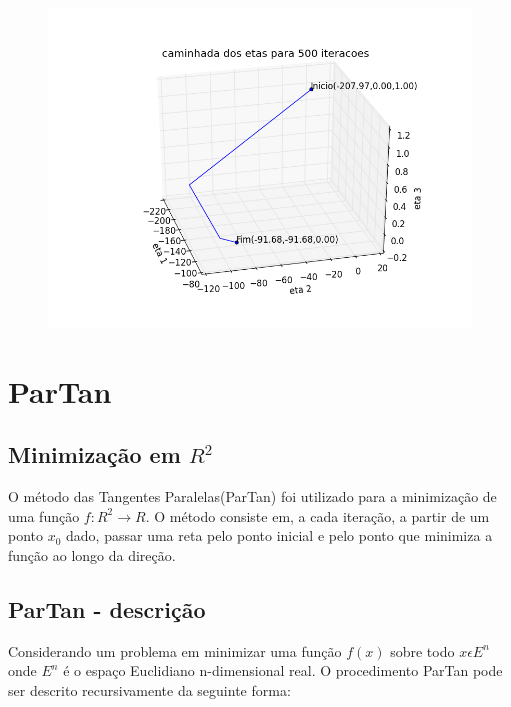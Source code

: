\documentclass[12pt]{article}
\begin{document}
\begin{figure}[!h]
\begin{center}
\includegraphics[width=12cm]{100_100_caminhada.png}
\end{center}
\end{figure}


\clearpage
\section{ParTan}
\mbox{}

\subsection{Minimização em $R^{2}$}
\mbox{}

O método das Tangentes Paralelas(ParTan) foi utilizado para a minimização de uma função $f : R^{2} \rightarrow R$. O método consiste em, a cada iteração, a partir de um ponto $x_{0}$ dado, passar uma reta pelo ponto inicial e pelo ponto que minimiza a função ao longo da direção.

\subsection{ParTan - descrição}
\mbox{}

Considerando um problema em minimizar uma função $f(x)$ sobre todo $x \epsilon E^{n}$ onde $E^{n}$ é o espaço Euclidiano n-dimensional real. O procedimento ParTan pode ser descrito recursivamente da seguinte forma:
\end{document}
